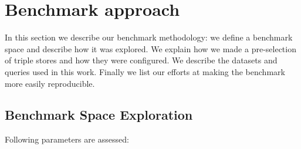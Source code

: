 \documentclass[twocolumn]{bmcart}%
\newcommand\todo[1]{\textcolor{red}{#1}}
\begin{document}






\section{Benchmark approach}
%


In this section we describe our benchmark methodology: we define a benchmark space and describe how it was explored. We explain how we made a pre-selection of triple stores
and how they were configured. We describe the datasets and queries used in this work. Finally we list our efforts at making the benchmark more easily reproducible.


\subsection{Benchmark Space Exploration}
\label{subsec:bmexplore}

Following parameters are assessed:
\end{document}
